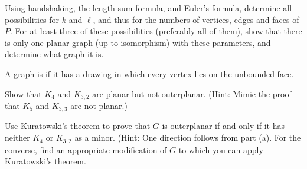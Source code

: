 Using handshaking, the length-sum formula, and Euler's formula, determine all possibilities for $k$ and $\ell$, and thus for the numbers of vertices, edges and faces of $P$.  For at least three of these possibilities (preferably all of them), show that there is only one planar graph (up to isomorphism) with these parameters, and determine what graph it is.

\prob A graph is  if it has a drawing in which every vertex lies on the unbounded face.

\probpart Show that $K_4$ and $K_{3,2}$ are planar but not outerplanar.  (Hint: Mimic the proof that $K_5$ and $K_{3,3}$ are not planar.)

\probpart Use Kuratowski's theorem to prove that $G$ is outerplanar if and only if it has neither $K_4$ or $K_{3,2}$ as a minor.  (Hint: One direction follows from part (a).  For the converse, find an appropriate modification of $G$ to which you can apply Kuratowski's theorem.

